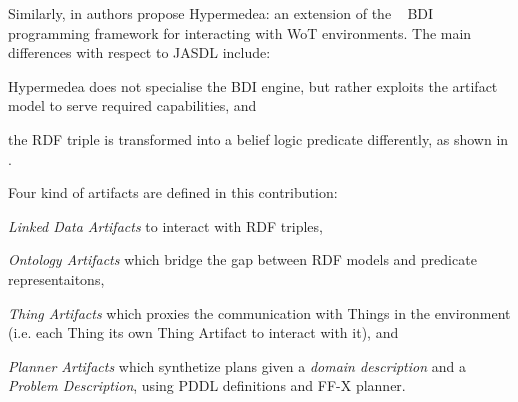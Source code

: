 \documentclass[
]{ceurart}
\begin{document}


Similarly, 
in \cite{DBLP:conf/www/CharpenayZLB22} authors propose Hypermedea: 
an extension of the \jacamo{}~\cite{BOISSIER2013747} \ac{BDI} programming framework
for interacting with \ac{WoT} environments.
%
The main differences with respect to JASDL include:
\begin{inlinelist}
\item Hypermedea does not specialise the \ac{BDI} engine, 
but rather exploits the \cartago{} artifact model to serve required capabilities, and
\item the \ac{RDF} triple is transformed into a belief logic predicate differently, as shown in .
\end{inlinelist} 
%
Four kind of artifacts are defined in this contribution: 
\begin{inlinelist}
  \item \textit{Linked Data Artifacts} to interact with \ac{RDF} triples,
  \item \textit{Ontology Artifacts} which bridge the gap between \ac{RDF} models and predicate representaitons,
  \item \textit{Thing Artifacts} which proxies the communication with Things in the environment (i.e. each Thing its own Thing Artifact to interact with it), and
  \item \textit{Planner Artifacts} which synthetize plans given a \textit{domain description} and a \textit{Problem Description}, using PDDL definitions and FF-X planner. 
\end{inlinelist}






\end{document}
